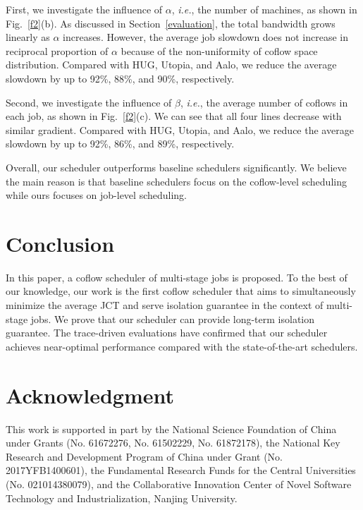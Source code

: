 \documentclass[10pt, conference, letterpaper]{IEEEtran}
\begin{document}
First, we investigate the influence of $\alpha$, \emph{i.e.}, the number of machines, as shown in Fig.~\ref{f2}(b). As discussed in Section~\ref{evaluation}, the total bandwidth grows linearly as $\alpha$ increases. However, the average job slowdown does not increase in reciprocal proportion of $\alpha$ because of the non-uniformity of coflow space distribution. Compared with HUG, Utopia, and Aalo, we reduce the average slowdown by up to 92\%, 88\%, and 90\%, respectively.

Second, we investigate the influence of $\beta$, \emph{i.e.}, the average number of coflows in each job, as shown in Fig.~\ref{f2}(c). We can see that all four lines decrease with similar gradient. Compared with HUG, Utopia, and Aalo, we reduce the average slowdown by up to 92\%, 86\%, and 89\%, respectively.

Overall, our scheduler outperforms baseline schedulers significantly. We believe the main reason is that baseline schedulers focus on the coflow-level scheduling while ours focuses on job-level scheduling.

\section{Conclusion}
In this paper, a coflow scheduler of multi-stage jobs is proposed. To the best of our knowledge, our work is the first coflow scheduler that aims to simultaneously minimize the average JCT and serve isolation guarantee in the context of multi-stage jobs. We prove that our scheduler can provide long-term isolation guarantee. The trace-driven evaluations have confirmed that our scheduler achieves near-optimal performance compared with the state-of-the-art schedulers.

\section*{Acknowledgment}
This work is supported in part by the National Science Foundation of China under Grants (No. 61672276, No. 61502229, No. 61872178), the National Key Research and Development Program of China under Grant (No. 2017YFB1400601), the Fundamental Research Funds for the Central Universities (No. 021014380079), and the Collaborative Innovation Center of Novel Software Technology and Industrialization, Nanjing University.



\end{document}
